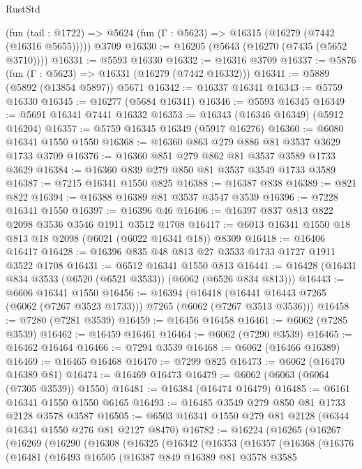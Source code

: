 \begin{lexlean}{RustStd}
\begin{coremodule}
    (fun (tail : @1722) => @5624 (fun (Γ : @5623) => @16315 (@16279 (@7442 (@16316 @5655)))))
    @3709
@16330 := @16205 (@5643 (@16270 (@7435 (@5652 @3710))))
@16331 := @5593 @16330
@16332 := @16316 @3709
@16337 := @5876 (fun (Γ : @5623) => @16331 (@16279 (@7442 @16332)))
@16341 := @5889 (@5892 (@13854 @5897)) @5671
@16342 := @16337 @16341
@16343 := @5759 @16330
@16345 := @16277 (@5684 @16341)
@16346 := @5593 @16345
@16349 := @5691 @16341 @7441 @16332
@16353 := @16343 (@16346 @16349) (@5912 @16204)
@16357 := @5759 @16345 @16349 (@5917 @16276)
@16360 := @6080 @16341 @1550 @1550
@16368 := @16360 @863 @279 @886 @81 @3537 @3629 @1733 @3709
@16376 := @16360 @851 @279 @862 @81 @3537 @3589 @1733 @3629
@16384 := @16360 @839 @279 @850 @81 @3537 @3549 @1733 @3589
@16387 := @7215 @16341 @1550 @825
@16388 := @16387 @838
@16389 := @821 @822
@16394 := @16388 @16389 @81 @3537 @3547 @3539
@16396 := @7228 @16341 @1550
@16397 := @16396 @46
@16406 := @16397 @837 @813 @822 @2098 @3536 @3546 @1911 @3512 @1708
@16417 := @6013 @16341 @1550 @18 @813 @18 @2098 (@6021 (@6022 @16341 @18)) @8309
@16418 := @16406 @16417
@16428 := @16396 @835 @48 @813 @27 @3533 @1733 @1727 @1911 @3522 @1708
@16431 := @6512 @16341 @1550 @813
@16441 := @16428 (@16431 @834 @3533 (@6520 (@6521 @3533)) (@6062 (@6526 @834 @813)))
@16443 := @6606 @16341 @1550
@16456 := @16394
    (@16418 (@16441 @16443 @7265 (@6062 (@7267 @3523 @1733))) @7265 (@6062 (@7267 @3513 @3536)))
@16458 := @7280 (@7281 @3539)
@16459 := @16456 @16458
@16461 := @6062 (@7285 @3539)
@16462 := @16459 @16461
@16464 := @6062 (@7290 @3539)
@16465 := @16462 @16464
@16466 := @7294 @3539
@16468 := @6062 (@16466 @16389)
@16469 := @16465 @16468
@16470 := @7299 @825
@16473 := @6062 (@16470 @16389 @81)
@16474 := @16469 @16473
@16479 := @6062 (@6063 (@6064 (@7305 @3539)) @1550)
@16481 := @16384 (@16474 @16479)
@16485 := @6161 @16341 @1550 @1550 @6165
@16493 := @16485 @3549 @279 @850 @81 @1733 @2128 @3578 @3587
@16505 := @6503 @16341 @1550 @279 @81 @2128 (@6344 @16341 @1550 @276 @81 @2127 @8470)
@16782 := @16224
    (@16265
      (@16267
        (@16269
          (@16290
            (@16308
              (@16325
                (@16342
                  (@16353
                    (@16357
                      (@16368
                        (@16376
                          (@16481
                            (@16493
                              @16505
                              (@16387
                                @849
                                @16389
                                @81
                                @3578
                                @3585

\end{coremodule}
\end{lexlean}
